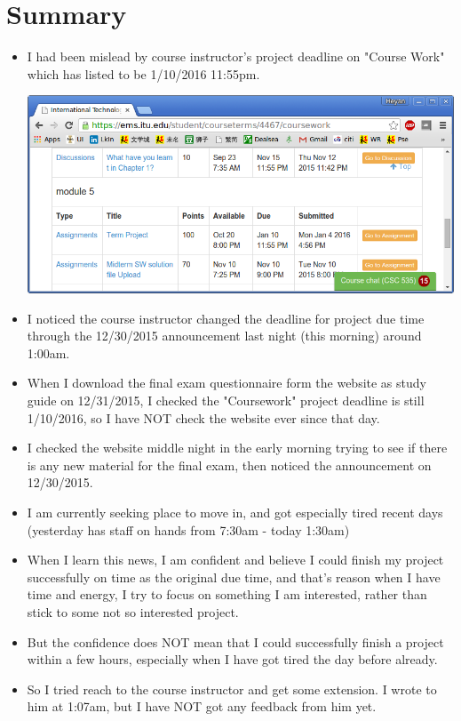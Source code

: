 \documentclass[9pt,b5paper]{article}
\begin{document}
\section{Summary}
\label{sec-3}
\begin{itemize}
\item I had been mislead by course instructor's project deadline on "Course Work" which has listed to be 1/10/2016 11:55pm. 

\includegraphics[width=.9\linewidth]{./pic/deadline.png}

\item I noticed the course instructor changed the deadline for project due time through the 12/30/2015 announcement last night (this morning) around 1:00am.
\item When I download the final exam questionnaire form the website as study guide on 12/31/2015, I checked the "Coursework" project deadline is still 1/10/2016, so I have NOT check the website ever since that day.
\item I checked the website middle night in the early morning trying to see if there is any new material for the final exam, then noticed the announcement on 12/30/2015.
\item I am currently seeking place to move in, and got especially tired recent days (yesterday has staff on hands from 7:30am - today 1:30am)
\item When I learn this news, I am confident and believe I could finish my project successfully on time as the original due time, and that's reason when I have time and energy, I try to focus on something I am interested, rather than stick to some not so interested project.
\item But the confidence does NOT mean that I could successfully finish a project within a few hours, especially when I have got tired the day before already.
\item So I tried reach to the course instructor and get some extension. I wrote to him at 1:07am, but I have NOT got any feedback from him yet.
\end{itemize}
\end{document}
